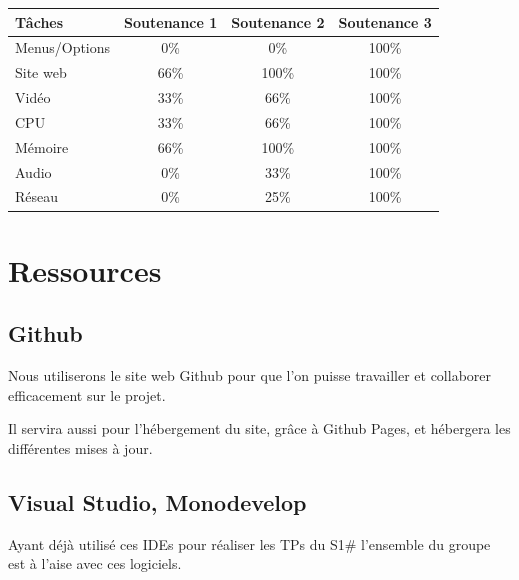 \documentclass[12pt, a4paper]{article}
\begin{document}
\begin{center}
\begin{tabular}{|l|c|c|c|}
\hline
\bf Tâches          & \bf Soutenance 1      & \bf Soutenance 2      & \bf Soutenance 3  \\
\hline 
Menus/Options       &      0\%                 &         0\%              &     100\%    \\
\hline 
Site web            &        66\%             &        100\%          &         100\%       \\
\hline 
Vidéo               &       33\%               &         66\%            &     100\%  \\
\hline 
CPU                 & 33\%                     &  66\%                   &   100\%    \\
\hline 
Mémoire             & 66\%                   & 100\%                   & 100\%  \\
\hline
Audio               &    0\%                   & 33\%                     & 100\%  \\
\hline
Réseau              & 0\%                   & 25\%                     & 100\%  \\

\hline
\end{tabular}

\end{center}




\pagebreak



\section{Ressources}

\bigskip
\subsection{Github}
Nous utiliserons le site web Github pour que l'on puisse travailler et collaborer efficacement sur le projet. 
\medskip

Il servira aussi pour l'hébergement du site, grâce à Github Pages, et hébergera les différentes mises à jour.


\bigskip
\subsection{Visual Studio, Monodevelop}
Ayant déjà utilisé ces IDEs pour réaliser les TPs du S1\# l'ensemble du groupe est à l'aise avec ces logiciels. 
\medskip
\end{document}
